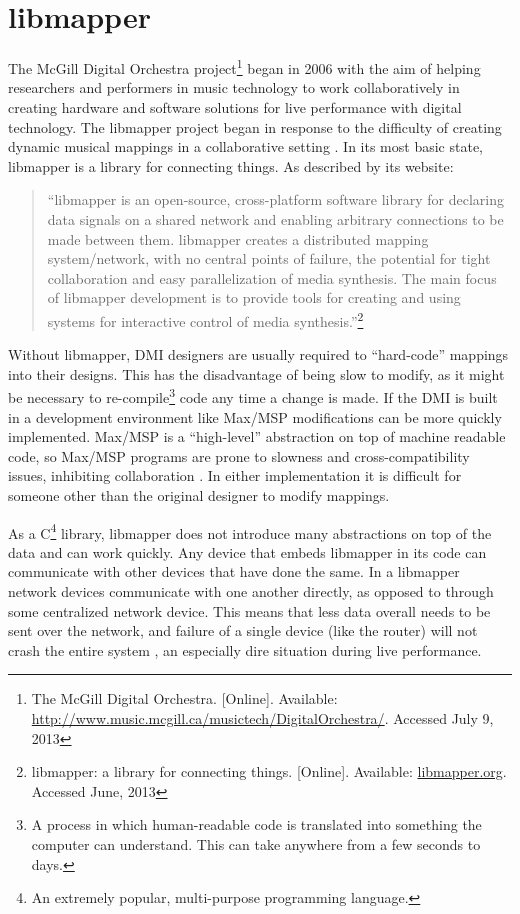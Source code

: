 
\chapter{libmapper}

The McGill Digital Orchestra project\footnote{The McGill Digital Orchestra. [Online]. Available: \url{http://www.music.mcgill.ca/musictech/DigitalOrchestra/}. Accessed July 9, 2013} began in 2006 with the aim of helping researchers and performers in music technology to work collaboratively in creating hardware and software solutions for live performance with digital technology. The libmapper project began in response to the difficulty of creating dynamic musical mappings in a collaborative setting . In its most basic state, libmapper is a library for connecting things. As described by its website: 

\begin{quote} 
``libmapper is an open-source, cross-platform software library for declaring data signals on a shared network and enabling arbitrary connections to be made between them. libmapper creates a distributed mapping system/network, with no central points of failure, the potential for tight collaboration and easy parallelization of media synthesis. The main focus of libmapper development is to provide tools for creating and using systems for interactive control of media synthesis.''\footnote{libmapper: a library for connecting things. [Online]. Available: \url{libmapper.org}. Accessed June, 2013}
\end{quote}

Without libmapper, DMI designers are usually required to ``hard-code'' mappings into their designs. This has the disadvantage of being slow to modify, as it might be necessary to re-compile\footnote{A process in which human-readable code is translated into something the computer can understand. This can take anywhere from a few seconds to days.} code any time a change is made. If the DMI is built in a development environment like Max/MSP modifications can be more quickly implemented. Max/MSP is a ``high-level'' abstraction on top of machine readable code, so Max/MSP programs are prone to slowness and cross-compatibility issues, inhibiting collaboration . In either implementation it is difficult for someone other than the original designer to modify mappings.

As a C\footnote{An extremely popular, multi-purpose programming language.} library, libmapper does not introduce many abstractions on top of the data and can work quickly. Any device that embeds libmapper in its code can communicate with other devices that have done the same. In a libmapper network devices communicate with one another directly, as opposed to through some centralized network device. This means that less data overall needs to be sent over the network, and failure of a single device (like the router) will not crash the entire system , an especially dire situation during live performance.

